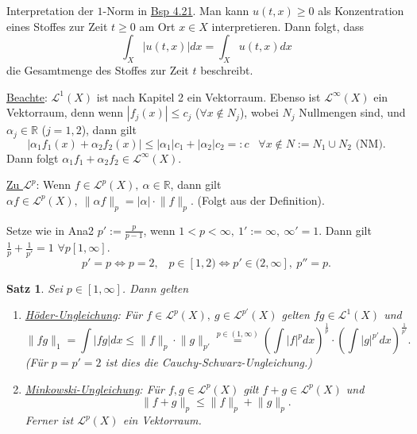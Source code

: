 \documentclass[a4paper]{scrreprt}
\newcommand{\R}{\mathbb{R}}
\newcommand{\Leb}{\mathcal{L}}
\newcommand{\jlabel}[1]{\label{j_#1}}
\newcommand{\jhyperref}[2]{\hyperref[j_#1]{#2}}
\newcommand{\jlink}[1]{\jhyperref{#1}{#1}}
\newcommand{\jspace}{\vspace{8pt}}
\newcommand{\jspacesmall}{\vspace{4pt}}
\theoremstyle{plain}
\newtheorem{satz}[thm]{Satz}
\theoremstyle{definition}
\begin{document}
{{{{Interpretation der $1$-Norm in \jlink{Bsp 4.21}. Man kann $u(t,x) \ge 0$ als Konzentration eines Stoffes zur Zeit $t\ge 0$ am Ort $x\in X$ interpretieren. Dann folgt, dass
\[
    \int_X |u(t,x)| dx = \int_X u(t,x) dx
\]
die Gesamtmenge des Stoffes zur Zeit $t$ beschreibt.

\jspace

\uline{Beachte}: $\Leb^1(X)$ ist nach Kapitel 2 ein Vektorraum. Ebenso ist $\Leb^\infty(X)$ ein Vektorraum, denn wenn $|f_j(x)|\le c_j$ ($\forall x \notin N_j$), wobei $N_j$ Nullmengen sind, und $\alpha_j \in \R$ ($j=1,2$), dann gilt
\[
    \tag{$*$}
    |\alpha_1 f_1(x) + \alpha_2 f_2(x)| \le |\alpha_1|c_1 + |\alpha_2| c_2 =: c \hspace{10pt} \forall x \notin N := N_1\cup N_2 \text{ (NM)}.
\]
Dann folgt $\alpha_1 f_1 + \alpha_2 f_2 \in \Leb^\infty(X)$.

\jspacesmall

\uline{Zu $\Leb^p$}: Wenn $f \in \Leb^p(X),\ \alpha \in \R$, dann gilt $\alpha f \in \Leb^p(X),\ \lVert \alpha f \rVert_p = |\alpha|\cdot \lVert f \rVert_p$. (Folgt aus der Definition).

\jspacesmall

Setze wie in Ana2 $p' := \frac{p}{p-1}$, wenn $1<p<\infty,\ 1':= \infty,\ \infty' = 1$. Dann gilt $\frac{1}{p} + \frac{1}{p'} = 1$ $\forall p [1,\infty]$.
\[
    p' = p \Leftrightarrow p = 2, \hspace{10pt} p\in [1,2) \Leftrightarrow p'\in(2,\infty],\ p'' = p.
\]


\begin{satz}
    \jlabel{Satz 5.1}
    Sei $p\in[1,\infty]$. Dann gelten
    \begin{enumerate}
        \item
            \jlabel{Satz 5.1a)}
            \jlabel{Hoelder}
            \uline{Höder-Ungleichung}: Für $f\in \Leb^p(X),\ g\in \Leb^{p'}(X)$ gelten $fg \in \Leb^1(X)$ und 
            \[
                \lVert fg \rVert_1 = \int |fg| dx \le \lVert f \rVert_p \cdot \lVert g \rVert_{p'} \overset{p\in (1,\infty)}{=} \left(\int |f|^p dx \right)^\frac{1}{p} \cdot \left(\int |g|^{p'} dx \right)^\frac{1}{p'}.
            \]
            (Für $p=p' = 2$ ist dies die Cauchy-Schwarz-Ungleichung.)
        \item
            \jlabel{Satz 5.1b)}
            \uline{Minkowski-Ungleichung}: Für $f,g \in \Leb^p(X)$ gilt  $f+g\in \Leb^p(X)$ und
            \[
                \lVert f+g \rVert_p \le \lVert f \rVert_p + \lVert g \rVert_p.
            \]
            Ferner ist $\Leb^p(X)$ ein Vektorraum.
    \end{enumerate}


\end{satz}}}}}
\end{document}
